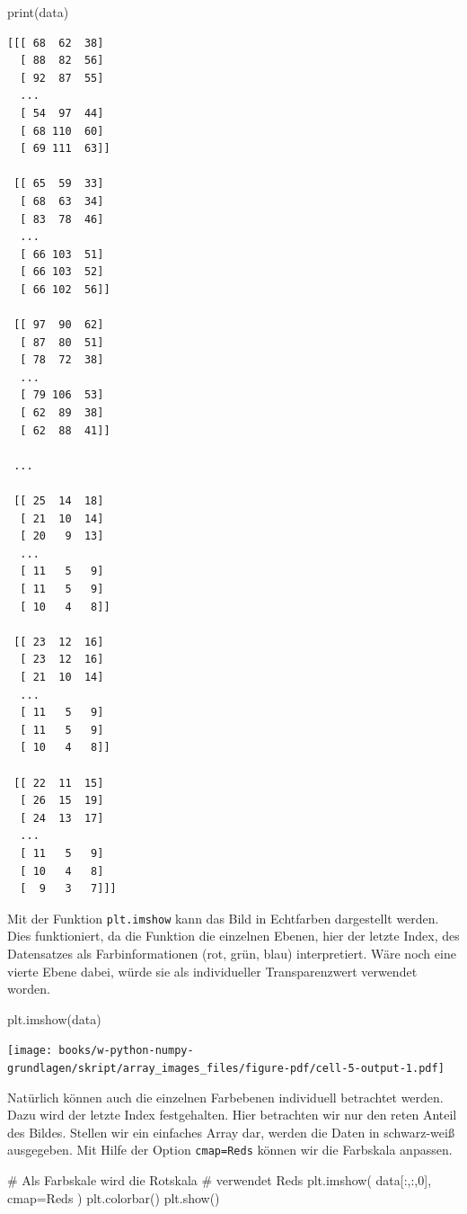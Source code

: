 \documentclass[
  letterpaper,
  DIV=11,
  numbers=noendperiod]{scrreprt}
\newenvironment{Shaded}{\begin{snugshade}}{\end{snugshade}}
\newcommand{\BuiltInTok}[1]{\textcolor[rgb]{0.00,0.23,0.31}{#1}}
\newcommand{\CommentTok}[1]{\textcolor[rgb]{0.37,0.37,0.37}{#1}}
\newcommand{\DecValTok}[1]{\textcolor[rgb]{0.68,0.00,0.00}{#1}}
\newcommand{\NormalTok}[1]{\textcolor[rgb]{0.00,0.23,0.31}{#1}}
\newcommand{\OperatorTok}[1]{\textcolor[rgb]{0.37,0.37,0.37}{#1}}
\newcommand{\StringTok}[1]{\textcolor[rgb]{0.13,0.47,0.30}{#1}}
\begin{document}
\begin{Shaded}
\begin{Highlighting}[]
\BuiltInTok{print}\NormalTok{(data)}
\end{Highlighting}
\end{Shaded}

\begin{verbatim}
[[[ 68  62  38]
  [ 88  82  56]
  [ 92  87  55]
  ...
  [ 54  97  44]
  [ 68 110  60]
  [ 69 111  63]]

 [[ 65  59  33]
  [ 68  63  34]
  [ 83  78  46]
  ...
  [ 66 103  51]
  [ 66 103  52]
  [ 66 102  56]]

 [[ 97  90  62]
  [ 87  80  51]
  [ 78  72  38]
  ...
  [ 79 106  53]
  [ 62  89  38]
  [ 62  88  41]]

 ...

 [[ 25  14  18]
  [ 21  10  14]
  [ 20   9  13]
  ...
  [ 11   5   9]
  [ 11   5   9]
  [ 10   4   8]]

 [[ 23  12  16]
  [ 23  12  16]
  [ 21  10  14]
  ...
  [ 11   5   9]
  [ 11   5   9]
  [ 10   4   8]]

 [[ 22  11  15]
  [ 26  15  19]
  [ 24  13  17]
  ...
  [ 11   5   9]
  [ 10   4   8]
  [  9   3   7]]]
\end{verbatim}

Mit der Funktion \texttt{plt.imshow} kann das Bild in Echtfarben
dargestellt werden. Dies funktioniert, da die Funktion die einzelnen
Ebenen, hier der letzte Index, des Datensatzes als Farbinformationen
(rot, grün, blau) interpretiert. Wäre noch eine vierte Ebene dabei,
würde sie als individueller Transparenzwert verwendet worden.

\begin{Shaded}
\begin{Highlighting}[]
\NormalTok{plt.imshow(data)}
\end{Highlighting}
\end{Shaded}

\texttt{[image: books/w-python-numpy-grundlagen/skript/array\_images\_files/figure-pdf/cell-5-output-1.pdf]}

Natürlich können auch die einzelnen Farbebenen individuell betrachtet
werden. Dazu wird der letzte Index festgehalten. Hier betrachten wir nur
den reten Anteil des Bildes. Stellen wir ein einfaches Array dar, werden
die Daten in schwarz-weiß ausgegeben. Mit Hilfe der Option
\texttt{cmap=\textquotesingle{}Reds\textquotesingle{}} können wir die
Farbskala anpassen.

\begin{Shaded}
\begin{Highlighting}[]
\CommentTok{\# Als Farbskale wird die Rotskala }
\CommentTok{\# verwendet \textquotesingle{}Reds\textquotesingle{}}
\NormalTok{plt.imshow( data[:,:,}\DecValTok{0}\NormalTok{], cmap}\OperatorTok{=}\StringTok{\textquotesingle{}Reds\textquotesingle{}}\NormalTok{ )}
\NormalTok{plt.colorbar()}
\NormalTok{plt.show()}
\end{Highlighting}
\end{Shaded}
\end{document}
